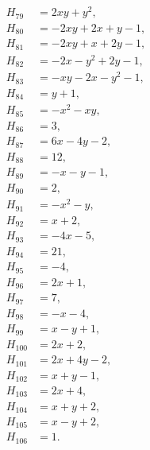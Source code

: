 \documentclass[11pt]{article}
\begin{document}
\begin{align*}
H_{79}&=2xy+y^{2},\\
H_{80}&=-2xy+2x+y-1,\\
H_{81}&=-2xy+x+2y-1,\\
H_{82}&=-2x-y^{2}+2y-1,\\
H_{83}&=-xy-2x-y^{2}-1,\\
H_{84}&=y+1,\\
H_{85}&=-x^{2}-xy,\\
H_{86}&=3,\\
H_{87}&=6x-4y-2,\\
H_{88}&=12,\\
H_{89}&=-x-y-1,\\
H_{90}&=2,\\
H_{91}&=-x^{2}-y,\\
H_{92}&=x+2,\\
H_{93}&=-4x-5,\\
H_{94}&=21,\\
H_{95}&=-4,\\
H_{96}&=2x+1,\\
H_{97}&=7,\\
H_{98}&=-x-4,\\
H_{99}&=x-y+1,\\
H_{100}&=2x+2,\\
H_{101}&=2x+4y-2,\\
H_{102}&=x+y-1,\\
H_{103}&=2x+4,\\
H_{104}&=x+y+2,\\
H_{105}&=x-y+2,\\
H_{106}&=1.
\end{align*}
\end{document}
